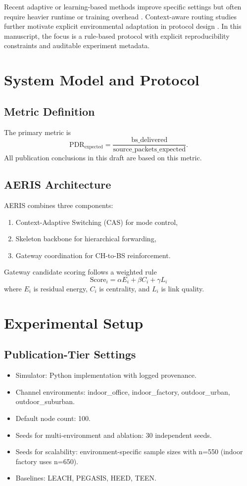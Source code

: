 ﻿\documentclass[sensors,article,submit,moreauthors,pdftex]{Definitions/mdpi}
\begin{document}
Recent adaptive or learning-based methods improve specific settings but often require heavier runtime or training overhead \cite{Ren2024,Okine2024,Chen2023Survey}. Context-aware routing studies further motivate explicit environmental adaptation in protocol design \cite{Liu2018Environment,Zhao2019Context}. In this manuscript, the focus is a rule-based protocol with explicit reproducibility constraints and auditable experiment metadata.

\section{System Model and Protocol}
\subsection{Metric Definition}
The primary metric is
\begin{equation}
\mathrm{PDR}_{\mathrm{expected}} = \frac{\mathrm{bs\_delivered}}{\mathrm{source\_packets\_expected}}.
\end{equation}
All publication conclusions in this draft are based on this metric.

\subsection{AERIS Architecture}
AERIS combines three components:
\begin{enumerate}
\item Context-Adaptive Switching (CAS) for mode control,
\item Skeleton backbone for hierarchical forwarding,
\item Gateway coordination for CH-to-BS reinforcement.
\end{enumerate}
Gateway candidate scoring follows a weighted rule
\begin{equation}
\mathrm{Score}_i = \alpha E_i + \beta C_i + \gamma L_i
\end{equation}
where $E_i$ is residual energy, $C_i$ is centrality, and $L_i$ is link quality.

\section{Experimental Setup}
\subsection{Publication-Tier Settings}
\begin{itemize}
\item Simulator: Python implementation with logged provenance.
\item Channel environments: indoor\_office, indoor\_factory, outdoor\_urban, outdoor\_suburban.
\item Default node count: 100.
\item Seeds for multi-environment and ablation: 30 independent seeds.
\item Seeds for scalability: environment-specific sample sizes with n=550 (indoor factory uses n=650).
\item Baselines: LEACH, PEGASIS, HEED, TEEN.
\end{itemize}
\end{document}
